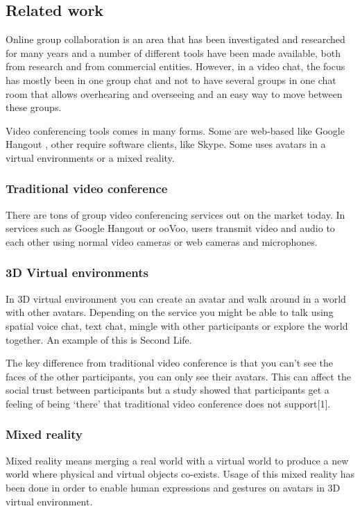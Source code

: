 \documentclass[12pt, titlepage]{article}
\begin{document}
\subsection{Related work}
Online group collaboration is an area that has been investigated and researched for many years and a number of different tools have been made available, both from research and from commercial entities. However, in a video chat, the focus has mostly been in one group chat and not to have several groups in one chat room that allows overhearing and overseeing and an easy way to move between these groups.

Video conferencing tools comes in many forms. Some are web-based like Google Hangout \cite{6}, other require software clients, like Skype\cite{10}. Some uses avatars in a virtual environments or a mixed reality.
\subsubsection{Traditional video conference}
There are tons of group video conferencing services out on the market today. In services such as Google Hangout\cite{6} or ooVoo\cite{7}, users transmit video and audio to each other using normal video cameras or web cameras and microphones.
\subsubsection{3D Virtual environments}
In 3D virtual environment you can create an avatar and walk around in a world with other avatars. Depending on the service you might be able to talk using spatial voice chat, text chat, mingle with other participants or explore the world together. An example of this is Second Life\cite{3}.

The key difference from traditional video conference is that you can’t see the faces of the other participants, you can only see their avatars. This can affect the social trust between participants but a study showed that participants get a feeling of being ‘there’ that traditional video conference does not support[1].
\subsubsection{Mixed reality}
Mixed reality means merging a real world with a virtual world to produce a new world where physical and virtual objects co-exists. Usage of this mixed reality has been done in order to enable human expressions and gestures on avatars in 3D virtual environment\cite{9}.
\end{document}
